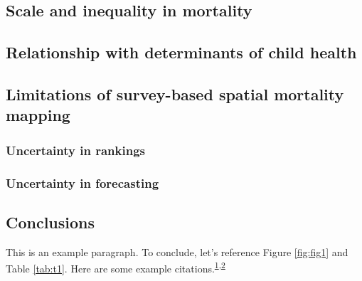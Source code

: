 \documentclass[
]{article}
\begin{document}
\lipsum[9-10]

\hypertarget{scale-and-inequality-in-mortality}{%
\subsection{Scale and inequality in mortality}\label{scale-and-inequality-in-mortality}}

\lipsum[11-14]

\hypertarget{relationship-with-determinants-of-child-health}{%
\subsection{Relationship with determinants of child health}\label{relationship-with-determinants-of-child-health}}

\lipsum[1-2]

\hypertarget{limitations-of-survey-based-spatial-mortality-mapping}{%
\subsection{Limitations of survey-based spatial mortality mapping}\label{limitations-of-survey-based-spatial-mortality-mapping}}

\lipsum[3-8]

\hypertarget{uncertainty-in-rankings}{%
\subsubsection{Uncertainty in rankings}\label{uncertainty-in-rankings}}

\lipsum[9-10]

\hypertarget{uncertainty-in-forecasting}{%
\subsubsection{Uncertainty in forecasting}\label{uncertainty-in-forecasting}}

\lipsum[11-12]

\hypertarget{conclusions}{%
\subsection{Conclusions}\label{conclusions}}

\lipsum[1]

This is an example paragraph. To conclude, let's reference Figure \ref{fig:fig1} and Table \ref{tab:t1}. Here are some example citations.\textsuperscript{\protect\hyperlink{ref-Aalbers}{1},\protect\hyperlink{ref-Aguirre2009}{2}}
\end{document}

